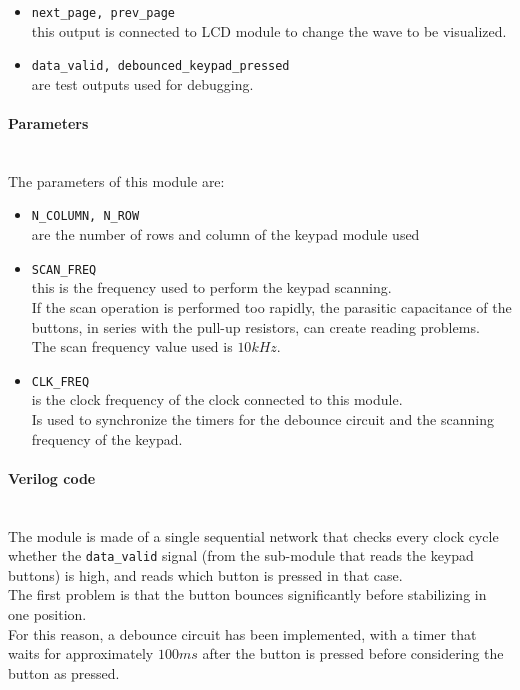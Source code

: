 \begin{itemize}
    \item \texttt{next\_page, prev\_page} \\
    this output is connected to LCD module to change the wave to be visualized.

    \item \texttt{data\_valid, debounced\_keypad\_pressed} \\
    are test outputs used for debugging.
    
\end{itemize}

\paragraph{Parameters} \quad \\
The parameters of this module are:

\begin{itemize}

    \item \texttt{N\_COLUMN, N\_ROW} \\
    are the number of rows and column of the keypad module used

    \item \texttt{SCAN\_FREQ} \\
    this is the frequency used to perform the keypad scanning. \\
    If the scan operation is performed too rapidly, the parasitic capacitance of the buttons, in series with the pull-up resistors, can create reading problems. \\
    The scan frequency value used is \(10kHz\).

    \item \texttt{CLK\_FREQ} \\
    is the clock frequency of the clock connected to this module. \\
    Is used to synchronize the timers for the debounce circuit and the scanning frequency of the keypad.
    
\end{itemize}

\paragraph{Verilog code} \quad \\
The module is made of a single sequential network that checks every clock cycle whether the \texttt{data\_valid} signal (from the sub-module that reads the keypad buttons) is high, and reads which button is pressed in that case. \\
The first problem is that the button bounces significantly before stabilizing in one position. \\
For this reason, a debounce circuit has been implemented, with a timer that waits for approximately \(100ms\) after the button is pressed before considering the button as pressed.

